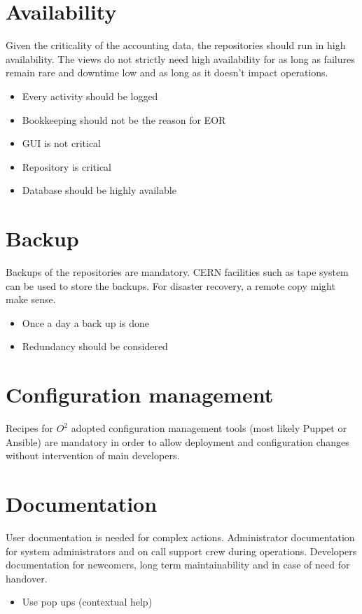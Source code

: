 \section{Availability}
Given the criticality of the accounting data, the repositories should run in high availability. The views do not strictly need high availability for as long as failures remain rare and downtime low and as long as it doesn’t impact operations.

\begin{itemize}
  \item Every activity should be logged
  \item Bookkeeping should not be the reason for EOR
  \item GUI is not critical
  \item Repository is critical
  \item Database should be highly available
\end{itemize}


\section{Backup}
Backups of the repositories are mandatory. CERN facilities such as tape system can be used to store the backups. For disaster recovery, a remote copy might make sense. 
\begin{itemize}
  \item Once a day a back up is done
  \item Redundancy should be considered
\end{itemize}

\section{Configuration management}
Recipes for $O^2$ adopted configuration management tools (most likely Puppet or Ansible) are mandatory in order to allow deployment and configuration changes without intervention of main developers. 

\section{Documentation}
User documentation is needed for complex actions. Administrator documentation for system administrators and on call support crew during operations. Developers documentation for newcomers, long term maintainability and in case of need for handover. 
\begin{itemize}
  \item Use pop ups (contextual help)
\end{itemize}

